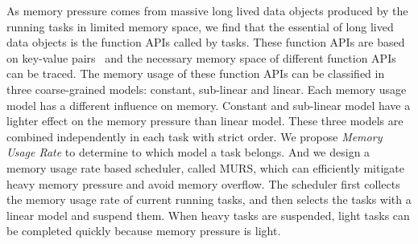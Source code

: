 As memory pressure comes from massive long lived data objects produced by the running tasks in limited memory space, we find that the essential of long lived data objects is the function APIs called by tasks. These function APIs are based on key-value pairs~\cite{dean2008mapreduce, zaharia2012resilient, hueske2012opening, isard2007dryad} and the necessary memory space of different function APIs can be traced. The memory usage of these function APIs can be classified in three coarse-grained models: constant, sub-linear and linear. Each memory usage model has a different influence on memory. Constant and sub-linear model have a lighter effect on the memory pressure than linear model. These three models are combined independently in each task with strict order. We propose \textit{Memory Usage Rate} to determine to which model a task belongs. And we design a memory usage rate based scheduler, called MURS, which can efficiently mitigate heavy memory pressure and avoid memory overflow. The scheduler first collects the memory usage rate of current running tasks, and then selects the tasks with a linear model and suspend them. When heavy tasks are suspended, light tasks can be completed quickly because memory pressure is light.



